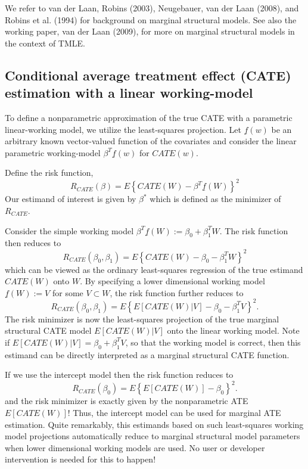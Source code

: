 \documentclass[article]{jss}
\begin{document}
We refer to van der Laan, Robins (2003), Neugebauer, van der Laan (2008), and Robins et al. (1994) for  background on marginal structural models. See also the working paper, van der Laan (2009), for more on marginal structural models in the context of TMLE.

\nocite{NEUGEBAUER2007419}
\nocite{vanderlaanunified}
\nocite{laan_rubin_2006}
\nocite{robinsCausal}

\subsection{Conditional average treatment effect (CATE) estimation with a linear working-model}
 

To define a nonparametric approximation of the true CATE with a parametric linear-working model, we utilize the least-squares projection. Let $\underline{f}(w)$ be an arbitrary known vector-valued function of the covariates and consider the linear parametric working-model $\beta^T \underline{f}(w)$ for $CATE(w)$. 

\noindent Define the risk function,
$$R_{CATE}(\beta) = E \left\{CATE(W) - \beta^T \underline{f}(W)\right\}^2$$
Our estimand of interest is given by $\beta^*$ which is defined as the minimizer of $R_{CATE}$.

\noindent Consider the simple working model $\beta^T\underline{f}(W) := \beta_0 + \beta_1^T W$. The risk function then reduces to
$$R_{CATE}(\beta_0, \beta_1) = E \left\{CATE(W) - \beta_0 - \beta_1^T W\right\}^2$$
which can be viewed as the ordinary least-squares regression of the true estimand $CATE(W)$ onto $W$. By specifying a lower dimensional working model $\underline{f}(W) := V$ for some $V \subset W$, the risk function further reduces to
$$R_{CATE}(\beta_0, \beta_1) = E \left\{E[CATE(W)|V] - \beta_0 - \beta_1^T V\right\}^2.$$
The risk minimizer is now the least-squares projection of the true marginal structural CATE model $E[CATE(W)|V]$ onto the linear working model. Note if $E[CATE(W)|V] =  \beta_0 + \beta_1^T V$, so that the working model is correct, then this estimand can be directly interpreted as a marginal structural CATE function.

\noindent  If we use the intercept model then the risk function reduces to
$$R_{CATE}(\beta_0) = E \left\{E[CATE(W)] - \beta_0 \right\}^2.$$
and the risk minimizer is exactly given by the nonparametric ATE $E[CATE(W)]$! Thus, the intercept model can be used for marginal ATE estimation. Quite remarkably, this estimands based on such least-squares working model projections automatically reduce to marginal structural model parameters when lower dimensional working models are used. No user or developer intervention is needed for this to happen! 
\end{document}
